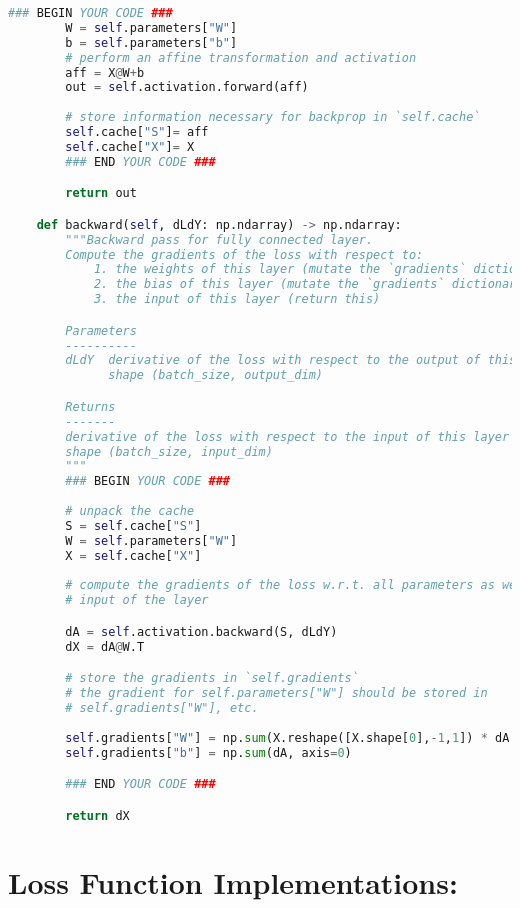 \begin{lstlisting}[language=Python]
        ### BEGIN YOUR CODE ###
        W = self.parameters["W"]
        b = self.parameters["b"]
        # perform an affine transformation and activation
        aff = X@W+b
        out = self.activation.forward(aff)
        
        # store information necessary for backprop in `self.cache`
        self.cache["S"]= aff
        self.cache["X"]= X
        ### END YOUR CODE ###

        return out

    def backward(self, dLdY: np.ndarray) -> np.ndarray:
        """Backward pass for fully connected layer.
        Compute the gradients of the loss with respect to:
            1. the weights of this layer (mutate the `gradients` dictionary)
            2. the bias of this layer (mutate the `gradients` dictionary)
            3. the input of this layer (return this)

        Parameters
        ----------
        dLdY  derivative of the loss with respect to the output of this layer
              shape (batch_size, output_dim)

        Returns
        -------
        derivative of the loss with respect to the input of this layer
        shape (batch_size, input_dim)
        """
        ### BEGIN YOUR CODE ###
        
        # unpack the cache
        S = self.cache["S"]
        W = self.parameters["W"]
        X = self.cache["X"]
        
        # compute the gradients of the loss w.r.t. all parameters as well as the
        # input of the layer

        dA = self.activation.backward(S, dLdY)
        dX = dA@W.T

        # store the gradients in `self.gradients`
        # the gradient for self.parameters["W"] should be stored in
        # self.gradients["W"], etc.
        
        self.gradients["W"] = np.sum(X.reshape([X.shape[0],-1,1]) * dA.reshape([dA.shape[0],1,-1]), axis=0)
        self.gradients["b"] = np.sum(dA, axis=0)

        ### END YOUR CODE ###

        return dX

\end{lstlisting}


\section{Loss Function Implementations:}

